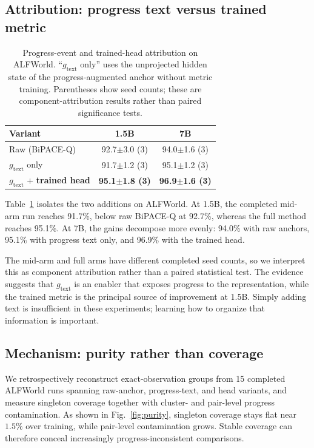 \documentclass[10pt,twocolumn,letterpaper]{article}
\begin{document}
\subsection{Attribution: progress text versus trained metric}
\label{sec:attrib}
\begin{table}[htbp]
\centering
\caption{Progress-event and trained-head attribution on ALFWorld. ``$g_{\mathrm{text}}$ only'' uses the unprojected hidden state of the progress-augmented anchor without metric training. Parentheses show seed counts; these are component-attribution results rather than paired significance tests.}
\label{tab:attrib}
\small
\setlength{\tabcolsep}{5.0pt}
\begin{tabular}{@{}lcc@{}}
\toprule
Variant & 1.5B & 7B \\
\midrule
Raw (BiPACE-Q) & 92.7$\pm$3.0 (3) & 94.0$\pm$1.6 (3) \\
$g_{\mathrm{text}}$ only & 91.7$\pm$1.2 (3) & 95.1$\pm$1.2 (3) \\
$g_{\mathrm{text}}$ + \textbf{trained head} & \textbf{95.1$\pm$1.8 (3)} & \textbf{96.9$\pm$1.6 (3)} \\
\bottomrule
\end{tabular}
\end{table}
Table~\ref{tab:attrib} isolates the two additions on ALFWorld. At 1.5B, the completed mid-arm run reaches 91.7\%, below raw BiPACE-Q at 92.7\%, whereas the full method reaches 95.1\%. At 7B, the gains decompose more evenly: 94.0\% with raw anchors, 95.1\% with progress text only, and 96.9\% with the trained head.

The mid-arm and full arms have different completed seed counts, so we interpret this as component attribution rather than a paired statistical test. The evidence suggests that $g_{\mathrm{text}}$ is an enabler that exposes progress to the representation, while the trained metric is the principal source of improvement at 1.5B. Simply adding text is insufficient in these experiments; learning how to organize that information is important.

\subsection{Mechanism: purity rather than coverage}
\label{sec:purity}
We retrospectively reconstruct exact-observation groups from 15 completed ALFWorld runs spanning raw-anchor, progress-text, and head variants, and measure singleton coverage together with cluster- and pair-level progress contamination. As shown in Fig.~\ref{fig:purity}, singleton coverage stays flat near $1.5\%$ over training, while pair-level contamination grows. Stable coverage can therefore conceal increasingly progress-inconsistent comparisons.
\end{document}
